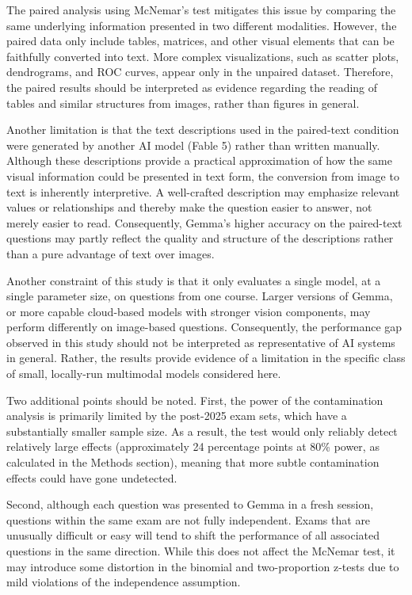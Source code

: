 \documentclass{article}
\begin{document}
The paired analysis using McNemar's test mitigates this issue by comparing the same underlying information presented in two different modalities. However, the paired data only include tables, matrices, and other visual elements that can be faithfully converted into text. More complex visualizations, such as scatter plots, dendrograms, and ROC curves, appear only in the unpaired dataset. Therefore, the paired results should be interpreted as evidence regarding the reading of tables and similar structures from images, rather than figures in general.

Another limitation is that the text descriptions used in the paired-text condition were generated by another AI model (Fable 5) rather than written manually. Although these descriptions provide a practical approximation of how the same visual information could be presented in text form, the conversion from image to text is inherently interpretive. A well-crafted description may emphasize relevant values or relationships and thereby make the question easier to answer, not merely easier to read. Consequently, Gemma's higher accuracy on the paired-text questions may partly reflect the quality and structure of the descriptions rather than a pure advantage of text over images. 

Another constraint of this study is that it only evaluates a single model, at a single parameter size, on questions from one course. Larger versions of Gemma, or more capable cloud-based models with stronger vision components, may perform differently on image-based questions. Consequently, the performance gap observed in this study should not be interpreted as representative of AI systems in general. Rather, the results provide evidence of a limitation in the specific class of small, locally-run multimodal models considered here.


Two additional points should be noted. First, the power of the contamination analysis is primarily limited by the post-2025 exam sets, which have a substantially smaller sample size. As a result, the test would only reliably detect relatively large effects (approximately 24 percentage points at 80\% power, as calculated in the Methods section), meaning that more subtle contamination effects could have gone undetected.

Second, although each question was presented to Gemma in a fresh session, questions within the same exam are not fully independent. Exams that are unusually difficult or easy will tend to shift the performance of all associated questions in the same direction. While this does not affect the McNemar test, it may introduce some distortion in the binomial and two-proportion z-tests due to mild violations of the independence assumption.
\end{document}
